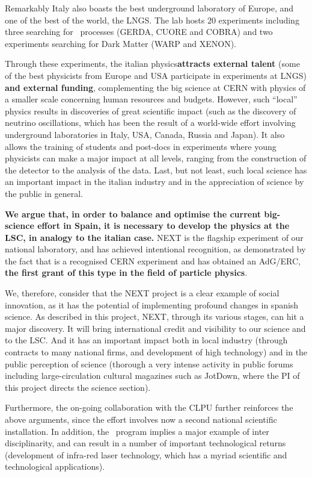 Remarkably Italy also boasts the best underground laboratory of Europe, and one of the best of the world, the LNGS. The lab hosts 20 experiments including three searching for \bbonu\ processes (GERDA, CUORE and COBRA) and two experiments searching for Dark Matter (WARP and XENON). 

Through these experiments, the italian physics{\bf attracts external talent} (some of the best physicists from Europe and USA participate in experiments at LNGS) {\bf and external funding}, complementing the big science at CERN with physics of a smaller scale concerning human resources and budgets. However, such ``local'' physics results in discoveries of great scientific impact (such as the discovery of neutrino oscillations, which has been the result of a world-wide effort involving underground laboratories in Italy, USA, Canada, Russia and Japan). It also allows the training of students and post-docs in experiments where young physicists can make a major impact at all levels, ranging from the construction of the detector to the analysis of the data. Last, but not least, such local science has an important impact in the italian industry and in the appreciation of science by the public in general. 

{\bf We argue that, in order to balance and optimise the current big-science effort in Spain, it is necessary to develop the physics at the LSC, in analogy to the italian case.} NEXT is the flagship experiment of our national laboratory, and has achieved intentional recognition, as demonstrated by the fact that is a recognised CERN experiment and has obtained an AdG/ERC, {\bf the first grant of this type in the field of particle physics}. 

We, therefore, consider that the NEXT project is a clear example of social innovation, as it has the potential of implementing profound changes in spanish science. As described in this project, NEXT, through its various stages, can hit a major discovery. It will bring international credit and visibility to our science and to the LSC. And it has an important impact both in local industry (through contracts to many national firms, and development of high technology) and in the public perception of science (thorough a very intense activity in public forums including large-circulation cultural magazines such as JotDown, where the PI of this project directs the science section). 

Furthermore, the on-going collaboration with the CLPU further reinforces the above arguments, since the effort involves now a second national scientific installation. In addition, the \BATA\ program implies a major example of inter disciplinarity, and can result in a number of important technological returns (development of infra-red laser technology, which has a myriad scientific and technological applications).

